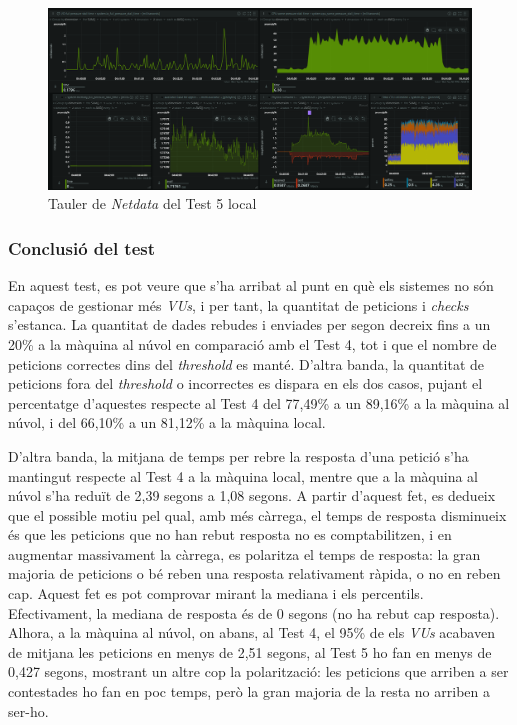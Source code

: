 \begin{figure}[!htbp]
    \includegraphics[width=1\textwidth]{Imatges/Tests/Local/5l-netdata.png}  
    \caption{Tauler de \textit{Netdata} del Test 5 local}
\end{figure}

\subsubsection{Conclusió del test}

En aquest test, es pot veure que s'ha arribat al punt en què els sistemes no són capaços de gestionar més \textit{VUs}, i per tant, la quantitat de peticions i \textit{checks} s'estanca. La quantitat de dades rebudes i enviades per segon decreix fins a un 20\% a la màquina al núvol en comparació amb el Test 4, tot i que el nombre de peticions correctes dins del \textit{threshold} es manté. D'altra banda, la quantitat de peticions fora del \textit{threshold} o incorrectes es dispara en els dos casos, pujant el percentatge d'aquestes respecte al Test 4 del 77,49\% a un 89,16\% a la màquina al núvol, i del 66,10\% a un 81,12\% a la màquina local.

D'altra banda, la mitjana de temps per rebre la resposta d'una petició s'ha mantingut respecte al Test 4 a la màquina local, mentre que a la màquina al núvol s'ha reduït de 2,39 segons a 1,08 segons. A partir d'aquest fet, es dedueix que el possible motiu pel qual, amb més càrrega, el temps de resposta disminueix és que les peticions que no han rebut resposta no es comptabilitzen, i en augmentar massivament la càrrega, es polaritza el temps de resposta: la gran majoria de peticions o bé reben una resposta relativament ràpida, o no en reben cap. Aquest fet es pot comprovar mirant la mediana i els percentils. Efectivament, la mediana de resposta és de 0 segons (no ha rebut cap resposta). Alhora, a la màquina al núvol, on abans, al Test 4, el 95\% de els \textit{VUs} acabaven de mitjana les peticions en menys de 2,51 segons, al Test 5 ho fan en menys de 0,427 segons, mostrant un altre cop la polarització: les peticions que arriben a ser contestades ho fan en poc temps, però la gran majoria de la resta no arriben a ser-ho.

